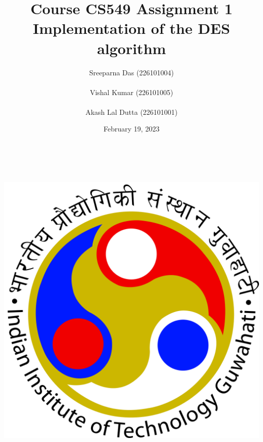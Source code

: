 \title{\large Course CS549 Assignment 1\\[0.5cm]
        \bf\Large Implementation of the DES algorithm}
\author{\large Sreeparna Das (226101004)\\
\\
        \large Vishal Kumar (226101005)\\
\\
        \large Akash Lal Dutta (226101001)}
        
\date{February 19, 2023}
\makeatletter
    \begin{titlepage}
        \begin{center}
        \vbox{}\vspace{5cm}
            {\@title }\\[3cm] 
            {\@author}\\
            \vfill \includegraphics[scale=0.2]{images/IITG_logo.png}\\[0.4cm]
            {\@date}
        \end{center}
    \end{titlepage}
\makeatother

